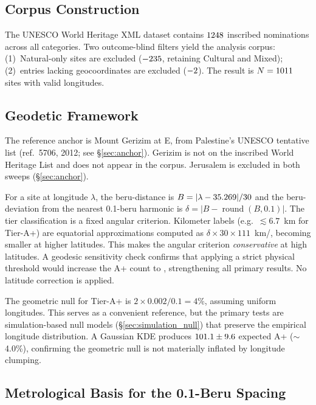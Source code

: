\documentclass[HARVARD,twocolumn]{USG}
\begin{document}
\subsection{Corpus Construction}
\label{sec:corpus}

The UNESCO World Heritage XML dataset contains $1248$ inscribed
nominations across all categories. Two outcome-blind filters yield the
analysis corpus: (1)~Natural-only sites are excluded ($-235$, retaining
Cultural and Mixed); (2)~entries lacking geocoordinates are excluded ($-2$).
The result is $N = 1011$ sites with valid longitudes.

\subsection{Geodetic Framework}

The reference anchor is Mount Gerizim at \GerizimLon\textdegree{}E,
from Palestine's UNESCO tentative list (ref.~5706, 2012; see \S\ref{sec:anchor}).
Gerizim is not on the inscribed World Heritage List and does not appear
in the corpus. Jerusalem is excluded in both sweeps (\S\ref{sec:anchor}).

For a site at longitude $\lambda$, the beru-distance is
$B = |\lambda - 35.269| / 30$ and the beru-deviation from the
nearest 0.1-beru harmonic is
$\delta = |B - \operatorname{round}(B, 0.1)|$.
The tier classification is a fixed angular criterion.
Kilometer labels (e.g.\ $\lesssim 6.7$~km for Tier-A+) are equatorial
approximations computed as $\delta \times 30 \times 111$~km/\textdegree{},
becoming smaller at higher latitudes. This makes the angular criterion
\emph{conservative} at high latitudes. A geodesic sensitivity check confirms
that applying a strict physical threshold would increase the A+ count to
\GeodesicApPhysical{}, strengthening all primary results. No latitude
correction is applied.

The geometric null for Tier-A+ is $2 \times 0.002 / 0.1 = 4\%$,
assuming uniform longitudes. This serves as a convenient reference, but
the primary tests are simulation-based null models (\S\ref{sec:simulation_null})
that preserve the empirical longitude distribution. A Gaussian KDE produces
$101.1 \pm 9.6$ expected A+ ($\sim$4.0\%), confirming the
geometric null is not materially inflated by longitude clumping.

\subsection{Metrological Basis for the 0.1-Beru Spacing}
\label{sec:metrology_basis}
\end{document}
